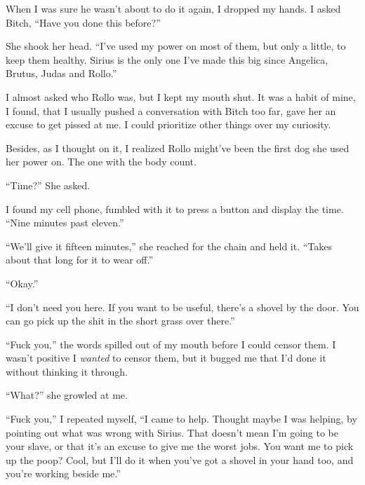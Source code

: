 When I was sure he wasn't about to do it again, I dropped my hands.  I asked Bitch, ``Have you done this before?''



She shook her head.  ``I've used my power on most of them, but only a little, to keep them healthy.  Sirius is the only one I've made this big since Angelica, Brutus, Judas and Rollo.''



I almost asked who Rollo was, but I kept my mouth shut.  It was a habit of mine, I found, that I usually pushed a conversation with Bitch too far, gave her an excuse to get pissed at me.  I could prioritize other things over my curiosity.



Besides, as I thought on it, I realized Rollo might've been the first dog she used her power on.  The one with the body count.



``Time?'' She asked.



I found my cell phone, fumbled with it to press a button and display the time.  ``Nine minutes past eleven.''



``We'll give it fifteen minutes,'' she reached for the chain and held it.  ``Takes about that long for it to wear off.''



``Okay.''



``I don't need you here.  If you want to be useful, there's a shovel by the door.  You can go pick up the shit in the short grass over there.''



``Fuck you,'' the words spilled out of my mouth before I could censor them.  I wasn't positive I \emph{wanted} to censor them, but it bugged me that I'd done it without thinking it through.



``What?'' she growled at me.



``Fuck you,'' I repeated myself, ``I came to help.  Thought maybe I was helping, by pointing out what was wrong with Sirius.  That doesn't mean I'm going to be your slave, or that it's an excuse to give me the worst jobs.  You want me to pick up the poop?  Cool, but I'll do it when you've got a shovel in your hand too, and you're working beside me.''



